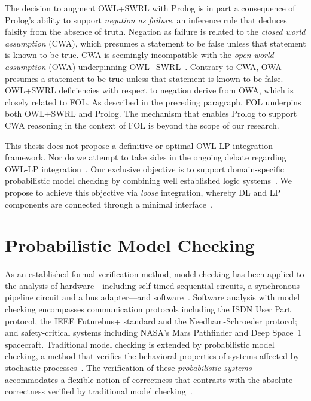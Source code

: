 The decision to augment OWL+SWRL with Prolog is in part a consequence of Prolog's ability to support \emph{negation as failure}, an inference rule that deduces falsity from the absence of truth. Negation as failure is related to the \emph{closed world assumption} (CWA), which presumes a statement to be false unless that statement is known to be true. CWA is seemingly incompatible with the \emph{open world assumption} (OWA) underpinning OWL+SWRL~\cite{Motik_2006}. Contrary to CWA, OWA presumes a statement to be true unless that statement is known to be false. OWL+SWRL deficiencies with respect to negation derive from OWA, which is closely related to FOL\@. As described in the preceding paragraph, FOL underpins both OWL+SWRL and Prolog. The mechanism that enables Prolog to support CWA reasoning in the context of FOL is beyond the scope of our research.

This thesis does not propose a definitive or optimal OWL-LP integration framework. Nor do we attempt to take sides in the ongoing debate regarding OWL-LP integration~\cite{Motik_2006}. Our exclusive objective is to support domain-specific probabilistic model checking by combining well established logic systems~\cite{Motik_2006,Costa_2012}. We propose to achieve this objective via \emph{loose} integration, whereby DL and LP components are connected through a minimal interface~\cite{Greco_2010}.

\section{Probabilistic Model Checking}
\label{sec:Probabilistic_Model_Checking}

As an established formal verification method, model checking has been applied to the analysis of hardware---including self-timed sequential circuits, a synchronous pipeline circuit and a bus adapter---and software~\cite{Baier_2008}. Software analysis with model checking encompasses communication protocols including the ISDN User Part protocol, the IEEE Futurebus+ standard and the Needham-Schroeder protocol; and safety-critical systems including NASA's Mars Pathfinder and Deep Space~1 spacecraft. Traditional model checking is extended by probabilistic model checking, a method that verifies the behavioral properties of systems affected by stochastic processes~\cite{Baier_2008,Kwiatkowska_2012}. The verification of these \emph{probabilistic systems} accommodates a flexible notion of correctness that contrasts with the absolute correctness verified by traditional model checking~\cite{Baier_2008}.


